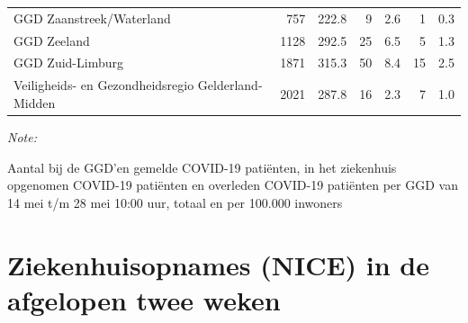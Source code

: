 \documentclass[
  english,
  man,floatsintext]{apa6}
\begin{document}
\begin{table}
\begin{threeparttable}
\begin{tabular}{lrrrrrr}
GGD Zaanstreek/Waterland & 757 & 222.8 & 9 & 2.6 & 1 & 0.3\\
GGD Zeeland & 1128 & 292.5 & 25 & 6.5 & 5 & 1.3\\
GGD Zuid-Limburg & 1871 & 315.3 & 50 & 8.4 & 15 & 2.5\\
Veiligheids- en Gezondheidsregio Gelderland-Midden & 2021 & 287.8 & 16 & 2.3 & 7 & 1.0\\
\bottomrule
\end{tabular}
\begin{tablenotes}
\item \textit{Note: } 
\item Aantal bij de GGD’en gemelde COVID-19 patiënten, in het ziekenhuis opgenomen COVID-19 patiënten en overleden COVID-19 patiënten per GGD van 14 mei t/m 28 mei 10:00 uur, totaal en per 100.000 inwoners
\end{tablenotes}
\end{threeparttable}
\endgroup{}
\end{table}

\newpage

\hypertarget{ziekenhuisopnames-nice-in-de-afgelopen-twee-weken}{%
\section{Ziekenhuisopnames (NICE) in de afgelopen twee weken}\label{ziekenhuisopnames-nice-in-de-afgelopen-twee-weken}}
\end{document}
